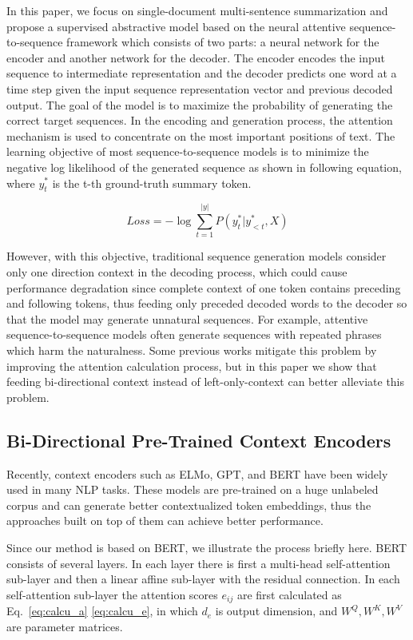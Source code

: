 \documentclass{article}
\begin{document}
In this paper, we focus on single-document multi-sentence summarization and propose a supervised abstractive model based on the neural attentive sequence-to-sequence framework which consists of two parts: a neural network for the encoder and another network for the decoder. The encoder encodes the input sequence to intermediate representation and the decoder predicts one word at a time step given the input sequence representation vector and previous decoded output. The goal of the model is to maximize the probability of generating the correct target sequences. In the encoding and generation process, the attention mechanism is used to concentrate on the most important positions of text. The learning objective of most sequence-to-sequence models is to minimize the negative log likelihood of the generated sequence as shown in following equation, where $y^*_t$ is the t-th ground-truth summary token. 

\begin{equation}
    Loss =  - \log \sum_{t=1}^{|y|} P(y_t^*|y_{<t}^*, X)
\end{equation}

However, with this objective, traditional sequence generation models consider only one direction context in the decoding process, which could cause performance degradation since complete context of one token contains preceding and following tokens, thus feeding only preceded decoded words to the decoder so that the model may generate unnatural sequences. For example, attentive sequence-to-sequence models often generate sequences with repeated phrases which harm the naturalness. Some previous works mitigate this problem by improving the attention calculation process, but in this paper we show that feeding bi-directional context instead of left-only-context can better alleviate this problem.

\subsection{Bi-Directional Pre-Trained Context Encoders}

Recently, context encoders such as ELMo, GPT, and BERT have been widely used in many NLP tasks. These models are pre-trained on a huge unlabeled corpus and can generate better contextualized token embeddings, thus the approaches built on top of them can achieve better performance. 

Since our method is based on BERT, we illustrate the process briefly here. BERT consists of several layers. In each layer there is first a multi-head self-attention sub-layer and then a linear affine sub-layer with the residual connection. In each self-attention sub-layer the attention scores $e_{ij}$ are first calculated as Eq.~\eqref{eq:calcu_a} \eqref{eq:calcu_e}, in which $d_e$ is output dimension, and $W^Q, W^K, W^V$ are parameter matrices.
\end{document}
